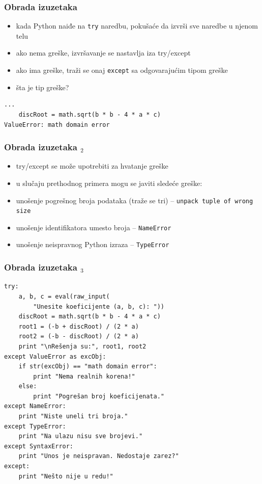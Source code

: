 \documentclass[utf8,compress]{beamer}
\begin{document}
\begin{frame}[fragile]
  \frametitle{Obrada izuzetaka}
  \begin{itemize}
    \item kada Python naiđe na \texttt{try} naredbu, pokušaće da izvrši sve naredbe u njenom telu
    \item ako nema greške, izvršavanje se nastavlja iza try/except
    \item ako ima greške, traži se onaj \texttt{except} sa odgovarajućim tipom greške
    \item šta je tip greške?
  \end{itemize}
\begin{verbatim}
...
    discRoot = math.sqrt(b * b - 4 * a * c)
ValueError: math domain error
\end{verbatim}
\end{frame}

\begin{frame}[fragile]
  \frametitle{Obrada izuzetaka $_2$}
  \begin{itemize}
    \item try/except se može upotrebiti za hvatanje  greške
    \item u slučaju prethodnog primera mogu se javiti sledeće greške:
    \item unošenje pogrešnog broja podataka (traže se tri) -- \texttt{unpack tuple of wrong size}
    \item unošenje identifikatora umesto broja -- \texttt{NameError}
    \item unošenje neispravnog Python izraza -- \texttt{TypeError}
  \end{itemize}
\end{frame}

\begin{frame}[fragile,shrink=10]
  \frametitle{Obrada izuzetaka $_3$}
\begin{verbatim}
try:
    a, b, c = eval(raw_input(
        "Unesite koeficijente (a, b, c): "))
    discRoot = math.sqrt(b * b - 4 * a * c)
    root1 = (-b + discRoot) / (2 * a)
    root2 = (-b - discRoot) / (2 * a)
    print "\nRešenja su:", root1, root2
except ValueError as excObj:
    if str(excObj) == "math domain error":
        print "Nema realnih korena!"
    else:
        print "Pogrešan broj koeficijenata."
except NameError:
    print "Niste uneli tri broja."
except TypeError:
    print "Na ulazu nisu sve brojevi."
except SyntaxError:
    print "Unos je neispravan. Nedostaje zarez?"
except:
    print "Nešto nije u redu!"
\end{verbatim}
\end{frame}
\end{document}
